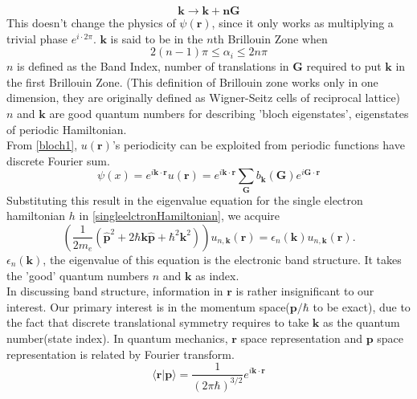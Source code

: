 \documentclass{article}
\begin{document}
\begin{equation}
	\mathbf{k}\to\mathbf{k+n\mathbf{G}}
\end{equation}
This doesn't change the physics of $\psi(\mathbf{r})$, since it only works as multiplying a trivial phase $e^{i\cdot2\pi}$. $\mathbf{k}$ is said to be in the $n$th Brillouin Zone when
\begin{equation}
	2(n-1)\pi\leq\alpha_{i}\leq2n\pi
\end{equation}
$n$ is defined as the Band Index, number of translations in $\mathbf{G}$ required to put $\mathbf{k}$ in the first Brillouin Zone. (This definition of Brillouin zone works only in one dimension, they are originally defined as Wigner-Seitz cells of reciprocal lattice)\\
$n$ and $\mathbf{k}$ are good quantum numbers for describing 'bloch eigenstates', eigenstates of periodic Hamiltonian.\\
From \eqref{bloch1}, $u(\mathbf{r})$'s periodicity can be exploited from periodic functions have discrete Fourier sum.
\begin{equation}
	\psi(x)=e^{i\mathbf{k}\cdot\mathbf{r}}u(\mathbf{r})=e^{i\mathbf{k}\cdot\mathbf{r}}\sum_{\mathbf{G}}b_{\mathbf{k}}(\mathbf{G})e^{i\mathbf{G}\cdot\mathbf{r}}\label{bloch3}
\end{equation}
Substituting this result in the eigenvalue equation for the single electron hamiltonian $h$ in \eqref{singleelctronHamiltonian}, we acquire
\begin{equation}
	\left(\frac{1}{2m_{e}}\left(\mathbf{\hat{p}}^{2}+2\hbar\mathbf{k}\mathbf{\hat{p}}+\hbar^{2}\mathbf{k}^{2}\right)\right)u_{n,\mathbf{k}}(\mathbf{r})=\epsilon_{n}(\mathbf{k})u_{n,\mathbf{k}}(\mathbf{r})\label{eigenvalueeqwithbandstructure}.
\end{equation}
$\epsilon_{n}(\mathbf{k})$, the eigenvalue of this equation is the electronic band structure. It takes the 'good' quantum numbers $n$ and $\mathbf{k}$ as index.\\
In discussing band structure, information in $\mathbf{r}$ is rather insignificant to our interest. Our primary interest is in the momentum space($\mathbf{p}/\hbar$ to be exact), due to the fact that discrete translational symmetry requires to take $\mathbf{k}$ as the quantum number(state index). In quantum mechanics, $\mathbf{r}$ space representation and $\mathbf{p}$ space representation is related by Fourier transform.
\begin{equation}
	\langle\mathbf{r}|\mathbf{p}\rangle=\frac{1}{(2\pi\hbar)^{3/2}}e^{i\mathbf{k}\cdot\mathbf{r}}
\end{equation}
\end{document}
